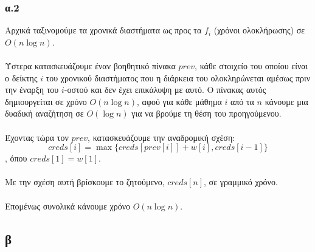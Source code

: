 \documentclass[12pt,a4paper]{article}
\begin{document}
  \subsubsection{α.2}

    Αρχικά ταξινομούμε τα χρονικά διαστήματα ως προς τα \( f_i \) (χρόνοι 
    ολοκλήρωσης) σε \( O(n\log{n}) \).\\
    \\
    Ύστερα κατασκευάζουμε έναν βοηθητικό πίνακα \( prev \), κάθε
    στοιχείο του οποίου είναι ο δείκτης \( i \) του χρονικού διαστήματος που
    η διάρκεια του ολοκληρώνεται αμέσως πριν την έναρξη του \( i \)-οστού και
    δεν έχει επικάλυψη με αυτό. Ο πίνακας αυτός δημιουργείται σε χρόνο \( O(n
    \log{n}) \), αφού για κάθε μάθημα \( i \) από τα \( n \) κάνουμε μια δυαδική
    αναζήτηση σε \( O(\log{n}) \) για να βρούμε τη θέση του προηγούμενου.\\
    \\
    Έχοντας τώρα τον \( prev \), κατασκευάζουμε την αναδρομική σχέση:
    \[ creds[i] = \max\{ creds[prev[i]] + w[i], creds[i - 1] \} \]
    , όπου \( creds[1] = w[1] \).\\
    \\
    Με την σχέση αυτή βρίσκουμε το ζητούμενο, \( creds[n] \), σε γραμμικό
    χρόνο.\\
    \\
    Επομένως συνολικά κάνουμε χρόνο \( O(n\log{n}) \).

  \subsection{β}
\end{document}

